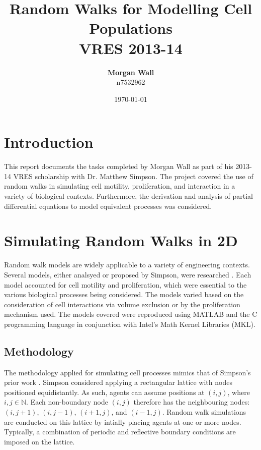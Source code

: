 \documentclass[11pt,a4paper]{article}
\title{\textbf{Random Walks for Modelling Cell Populations} \\ VRES 2013-14}
\author{\textbf{Morgan Wall} \\ n7532962}
\date{\today}
\begin{document}

\maketitle






\section{Introduction}
	\label{sec:introduction}
	
	This report documents the tasks completed by Morgan Wall as part of his 2013-14 VRES scholarship with Dr. Matthew Simpson. The project covered the use of random walks in simulating cell motility, proliferation, and interaction in a variety of biological contexts. Furthermore, the derivation and analysis of partial differential equations to model equivalent processes was considered.


\section{Simulating Random Walks in 2D}
	\label{sec:simrandin2d}
	
	Random walk models are widely applicable to a variety of engineering contexts. Several models, either analsyed or proposed by Simpson, were researched \cite{simpson2009diffusing,simpson2010cell}. Each model accounted for cell motility and proliferation, which were essential to the various biological processes being considered. The models varied based on the consideration of cell interactions via volume exclusion or by the proliferation mechanism used. The models covered were reproduced using MATLAB and the C programming language in conjunction with Intel's Math Kernel Libraries (MKL).

	\subsection{Methodology}
		\label{sub:methodology}
		
		The methodology applied for simulating cell processes mimics that of Simpson's prior work \cite{simpson2009diffusing,simpson2010cell}. Simpson considered applying a rectangular lattice with nodes positioned equidistantly. As such, agents can assume positions at $(i, j)$, where $i, j \in \mathbb{N}$. Each non-boundary node $(i, j)$ therefore has the neighbouring nodes: $(i, j + 1)$, $(i, j - 1)$, $(i + 1, j)$, and $(i - 1, j)$. Random walk simulations are conducted on this lattice by intially placing agents at one or more nodes. Typically, a combination of periodic \cite{periodiccond} and reflective boundary conditions \cite{reflectivecond} are imposed on the lattice.
\end{document}
